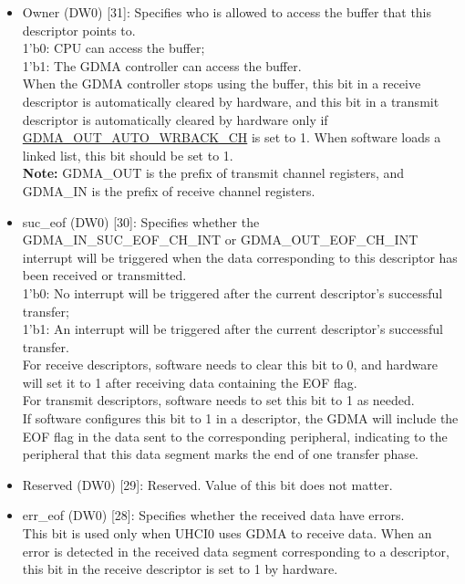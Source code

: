 \documentclass[main\_\_EN.tex]{subfiles}
\begin{document}
\begin{itemize}
    \item Owner (DW0) [31]: Specifies who is allowed to access the buffer that this descriptor points to.\\
    1'b0: CPU can access the buffer; \\
    1'b1: The GDMA controller can access the buffer.\\
    When the GDMA controller stops using the buffer, this bit in a receive descriptor is automatically cleared by hardware, and this bit in a transmit descriptor is automatically cleared by hardware only if \\\hyperref[fielddesc:DMAOUTAUTOWRBACKCHN]{GDMA\_OUT\_AUTO\_WRBACK\_CH} is set to 1. When software loads a linked list, this bit should be set to 1.
    \\{\bfseries Note:} GDMA\_OUT is the prefix of transmit channel registers, and GDMA\_IN is the prefix of receive channel registers.
    \item suc\_eof (DW0) [30]: Specifies whether the GDMA\_IN\_SUC\_EOF\_CH\_INT or GDMA\_OUT\_EOF\_CH\_INT interrupt will be triggered when the data corresponding to this descriptor has been received or transmitted.\\
    1'b0: No interrupt will be triggered after the current descriptor's successful transfer;\\
    1'b1: An interrupt will be triggered after the current descriptor's successful transfer.\\
    For receive descriptors, software needs to clear this bit to 0, and hardware will set it to 1 after receiving data containing the EOF flag.\\
    For transmit descriptors, software needs to set this bit to 1 as needed.\\
    If software configures this bit to 1 in a descriptor, the GDMA will include the EOF flag in the data sent to the corresponding peripheral, indicating to the peripheral that this data segment marks the end of one transfer phase.
    \item Reserved (DW0) [29]: Reserved. Value of this bit does not matter.
    \item err\_eof (DW0) [28]: Specifies whether the received data have errors.\\
    This bit is used only when UHCI0 uses GDMA to receive data. When an error is detected in the received data segment corresponding to a descriptor, this bit in the receive descriptor is set to 1 by hardware.

\end{itemize}
\end{document}

